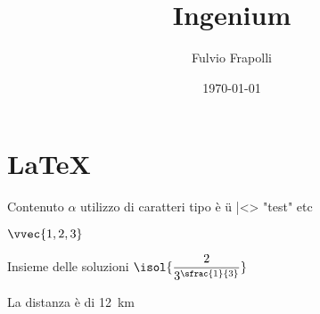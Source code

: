 \documentclass[]{article}
\title{Ingenium}
\author{Fulvio Frapolli}
\date{\today}
\begin{document}
\maketitle

\tableofcontents
\newpage



\section{\LaTeX}

Contenuto $\alpha$ utilizzo di caratteri tipo è ü |<> "test"
 etc

 $\vvec{1,2,3}$

 Insieme delle soluzioni $\isol{\dfrac{2}{3^{\sfrac{1}{3}}}}$

 La distanza è di \qty{12}{\km}    
\end{document}
